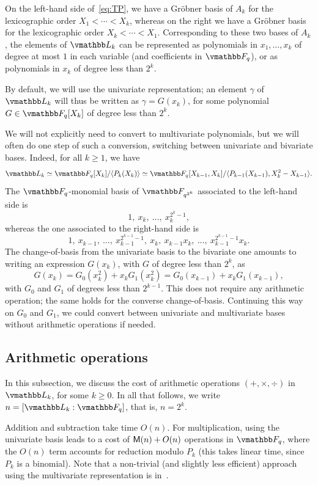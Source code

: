 On the left-hand side of~\eqref{eq:TP}, we have a Gr{\"o}bner basis of
$A_k$ for the lexicographic order $X_1 < \cdots < X_k$, whereas on the
right we have a Gr{\"o}bner basis for the lexicographic order $X_k <
\cdots < X_1$. Corresponding to these two bases of $A_k$, the elements
of $\L_k$ can be represented as polynomials in $x_1,\dots,x_k$ of
degree at most $1$ in each variable (and coefficients in $\F_q$), or
as polynomials in $x_k$ of degree less than $2^k$.

By default, we will use the univariate representation; an element
$\gamma$ of $\L_k$ will thus be written as $\gamma=G(x_k)$, for some
polynomial $G \in \F_q[X_k]$ of degree less than $2^k$.

We will not explicitly need to convert to multivariate polynomials,
but we will often do one step of such a conversion, switching between
univariate and bivariate bases. Indeed, for all $k \ge 1$, we have
$$\L_k \simeq \F_q[X_k]/\langle P_k(X_k) \rangle \simeq \F_q[X_{k-1},X_k]/\langle
P_{k-1}(X_{k-1}), X_k^2-X_{k-1}\rangle.$$ The $\F_q$-monomial basis of
$\F_{q^{2^k}}$ associated to the left-hand side is
$$1,\ x_k,\ \dots,\ x_k^{2^k-1},$$ whereas the one associated to the
right-hand side is
$$1,\ x_{k-1},\ \dots,\ x_{k-1}^{2^{k-1}-1},\ x_k,\ x_{k-1}x_k,\ \dots,\ x_{k-1}^{2^{k-1}-1}x_k.$$
The change-of-basis from the univariate basis to the bivariate one
amounts to writing an expression $G(x_k)$, with $G$ of degree less
than $2^{k}$, as
$$G(x_k) = G_0(x_k^2) + x_k G_1(x_k^2) = G_0(x_{k-1}) + x_k
G_1(x_{k-1}),$$ with $G_0$ and $G_1$ of degrees less than
$2^{k-1}$. This does not require any arithmetic operation; the same
holds for the converse change-of-basis. Continuing this way on $G_0$
and $G_1$, we could convert between univariate and multivariate bases
without arithmetic operations if needed.


\subsection{Arithmetic operations}

In this subsection, we discuss the cost of arithmetic operations
$(+,\times,\div)$ in $\L_k$, for some $k \ge 0$.  In all that follows,
we write $n=[\L_k:\F_q]$, that is, $n=2^k$.

Addition and subtraction take time $O(n)$. For multiplication, using
the univariate basis leads to a cost of $\mathsf{M}(n)+O(n)$ operations in
$\F_q$, where the $O(n)$ term accounts for reduction modulo $P_k$
(this takes linear time, since $P_k$ is a binomial). Note that a
non-trivial (and slightly less efficient) approach using the
multivariate representation is in~\cite{BoChHoSc11}.

